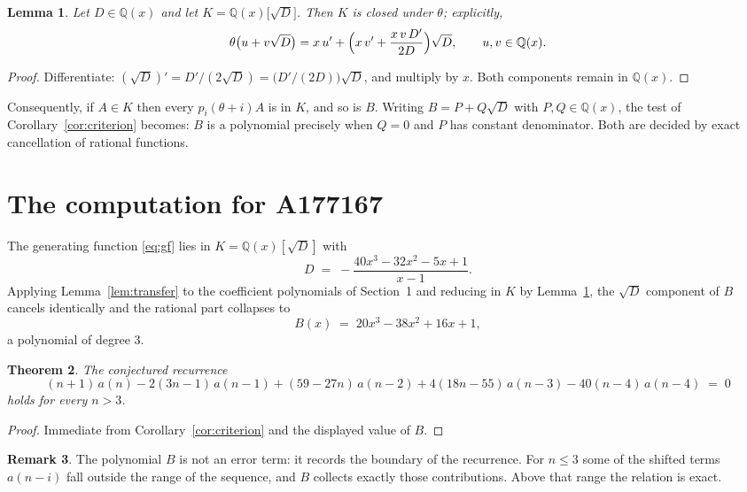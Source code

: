 \documentclass[11pt,a4paper]{article}
\theoremstyle{plain}
\newtheorem{theorem}{Theorem}
\newtheorem{lemma}[theorem]{Lemma}
\theoremstyle{definition}
\newtheorem{remark}[theorem]{Remark}
\begin{document}
\begin{lemma}\label{lem:field}
Let $D\in\mathbb{Q}(x)$ and let $K=\mathbb{Q}(x)\bigl[\sqrt{D}\bigr]$. Then $K$ is closed
under $\theta$; explicitly,
\[
\theta\bigl(u+v\sqrt{D}\bigr)=x\,u'+\Bigl(x\,v'+\frac{x\,v\,D'}{2D}\Bigr)\sqrt{D},
\qquad u,v\in\mathbb{Q}(x).
\]
\end{lemma}

\begin{proof}
Differentiate: $(\sqrt{D})'=D'/(2\sqrt{D})=\bigl(D'/(2D)\bigr)\sqrt{D}$, and multiply by
$x$. Both components remain in $\mathbb{Q}(x)$.
\end{proof}

Consequently, if $A\in K$ then every $p_{i}(\theta+i)A$ is in $K$, and so is $B$. Writing
$B=P+Q\sqrt{D}$ with $P,Q\in\mathbb{Q}(x)$, the test of Corollary~\ref{cor:criterion}
becomes: $B$ is a polynomial precisely when $Q=0$ and $P$ has constant denominator. Both
are decided by exact cancellation of rational functions.

\section{The computation for A177167}

The generating function \eqref{eq:gf} lies in $K=\mathbb{Q}(x)[\sqrt{D}]$ with
\[
D \;=\; - \frac{40 x^{3} - 32 x^{2} - 5 x + 1}{x - 1} .
\]
Applying Lemma~\ref{lem:transfer} to the coefficient polynomials of Section~1 and reducing
in $K$ by Lemma~\ref{lem:field}, the $\sqrt{D}$ component of $B$ cancels identically and
the rational part collapses to
\[
B(x)\;=\;20 x^{3} - 38 x^{2} + 16 x + 1 ,
\]
a polynomial of degree $3$.

\begin{theorem}
The conjectured recurrence
\[
(n + 1)\,a(n) -  2 \left(3 n - 1\right)\,a(n-1) + (59 - 27 n)\,a(n-2) + 4 \left(18 n - 55\right)\,a(n-3) -  40 \left(n - 4\right)\,a(n-4) \;=\;0
\]
holds for every $n>3$.
\end{theorem}

\begin{proof}
Immediate from Corollary~\ref{cor:criterion} and the displayed value of $B$.
\end{proof}

\begin{remark}
The polynomial $B$ is not an error term: it records the boundary of the recurrence. For
$n\le3$ some of the shifted terms $a(n-i)$ fall outside the range of the sequence,
and $B$ collects exactly those contributions. Above that range the relation is exact.
\end{remark}
\end{document}
